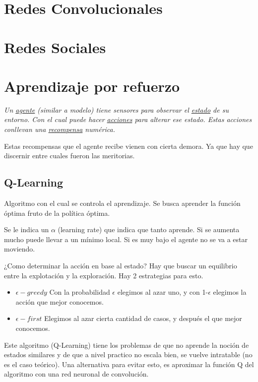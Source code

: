 \documentclass[titlepage,a4paper]{article}
\begin{document}
\section{Redes Convolucionales}


\section{Redes Sociales}


\section{Aprendizaje por refuerzo}
\textit{
Un \underline{agente} (similar a modelo) tiene sensores para observar el \underline{estado} de su entorno. Con el cual puede hacer \underline{acciones} para alterar ese estado. Estas acciones conllevan una \underline{recompensa} numérica.
}


Estas recompensas que el agente recibe vienen con cierta demora. Ya que hay que discernir entre cuales fueron las meritorias.


\subsection{Q-Learning}
Algoritmo con el cual se controla el aprendizaje. Se busca aprender la función óptima fruto de la política óptima.

Se le indica un $\alpha$ (learning rate) que indica que tanto aprende. Si se aumenta mucho puede llevar a un mínimo local. Si es muy bajo el agente no se va a estar moviendo.

¿Como determinar la acción en base al estado? Hay que buscar un equilibrio entre la explotación y la exploración. Hay 2 estrategias para esto.

\begin{itemize} %
    \item $\epsilon-greedy$ Con la probabilidad $\epsilon$ elegimos al azar uno, y con 1-$\epsilon$ elegimos la acción que mejor conocemos.
    \item $\epsilon-first$ Elegimos al azar cierta cantidad de casos, y después el que mejor conocemos. 
\end{itemize}

Este algoritmo (Q-Learning) tiene los problemas de que no aprende la noción de estados similares y de que a nivel practico no escala bien, se vuelve intratable (no es el caso teórico). Una alternativa para evitar esto, es aproximar la función Q del algoritmo con una red neuronal de convolución.
\end{document}
